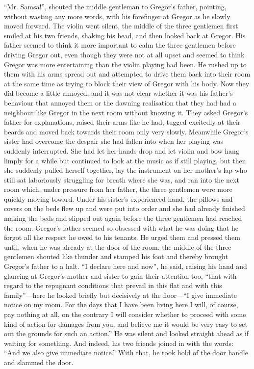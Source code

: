 “Mr. Samsa!”, shouted the middle gentleman to Gregor’s father,
pointing, without wasting any more words, with his forefinger at Gregor
as he slowly moved forward. The violin went silent, the middle of the
three gentlemen first smiled at his two friends, shaking his head, and
then looked back at Gregor. His father seemed to think it more
important to calm the three gentlemen before driving Gregor out, even
though they were not at all upset and seemed to think Gregor was more
entertaining than the violin playing had been. He rushed up to them
with his arms spread out and attempted to drive them back into their
room at the same time as trying to block their view of Gregor with his
body. Now they did become a little annoyed, and it was not clear
whether it was his father’s behaviour that annoyed them or the dawning
realisation that they had had a neighbour like Gregor in the next room
without knowing it. They asked Gregor’s father for explanations, raised
their arms like he had, tugged excitedly at their beards and moved back
towards their room only very slowly. Meanwhile Gregor’s sister had
overcome the despair she had fallen into when her playing was suddenly
interrupted. She had let her hands drop and let violin and bow hang
limply for a while but continued to look at the music as if still
playing, but then she suddenly pulled herself together, lay the
instrument on her mother’s lap who still sat laboriously struggling for
breath where she was, and ran into the next room which, under pressure
from her father, the three gentlemen were more quickly moving toward.
Under his sister’s experienced hand, the pillows and covers on the beds
flew up and were put into order and she had already finished making the
beds and slipped out again before the three gentlemen had reached the
room. Gregor’s father seemed so obsessed with what he was doing that he
forgot all the respect he owed to his tenants. He urged them and
pressed them until, when he was already at the door of the room, the
middle of the three gentlemen shouted like thunder and stamped his foot
and thereby brought Gregor’s father to a halt. “I declare here and
now”, he said, raising his hand and glancing at Gregor’s mother and
sister to gain their attention too, “that with regard to the repugnant
conditions that prevail in this flat and with this family”—here he
looked briefly but decisively at the floor—“I give immediate notice on
my room. For the days that I have been living here I will, of course,
pay nothing at all, on the contrary I will consider whether to proceed
with some kind of action for damages from you, and believe me it would
be very easy to set out the grounds for such an action.” He was silent
and looked straight ahead as if waiting for something. And indeed, his
two friends joined in with the words: “And we also give immediate
notice.” With that, he took hold of the door handle and slammed the
door.

